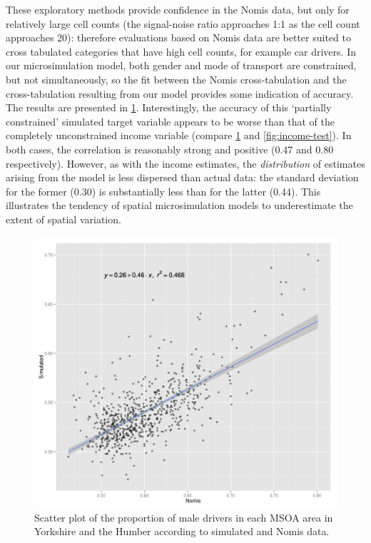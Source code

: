 \documentclass[a4paper, 11pt, twoside]{article}
\begin{document}
These exploratory methods provide confidence in the Nomis data, but only for
relatively large cell counts (the signal-noise ratio approaches 1:1 as the cell
count approaches 20): therefore evaluations based on Nomis data are better
suited to cross tabulated categories that have high cell counts, for example car
drivers. In our microsimulation model, both gender and mode of
transport are constrained, but not simultaneously, so the fit between the Nomis
cross-tabulation and the cross-tabulation resulting from our model provides
some indication of accuracy. The results are presented in
\cref{no-vs-sim-mcar}. Interestingly, the accuracy of this `partially
constrained' simulated target variable appears to be worse than that of the
completely unconstrained income variable (compare \cref{no-vs-sim-mcar}
and \cref{fig:income-test}). In both cases, the correlation is reasonably strong
and positive (0.47 and 0.80 respectively). However, as with the income
estimates, the \emph{distribution} of estimates arising from the model
is less dispersed than actual data: the standard deviation for the former (0.30)
is substantially less than for the latter (0.44). This illustrates the tendency
of spatial microsimulation models to underestimate the extent of spatial
variation. %

\begin{figure}
 \includegraphics[width = 12 cm]{no-vs-sim-mcar}
\caption[Scatter plot of the proportion of male drivers]{Scatter plot of
the proportion of male drivers in each MSOA area in
Yorkshire and the Humber according to simulated and Nomis data.}
\label{no-vs-sim-mcar}
\end{figure}
\end{document}
